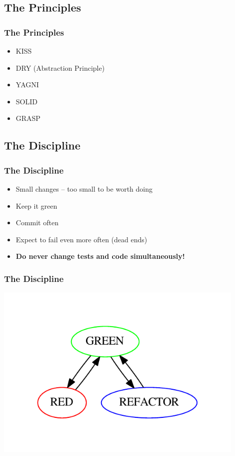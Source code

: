 \documentclass[english,handout]{beamer}
\begin{document}
\subsection{The Principles}

\begin{frame}
\frametitle{The Principles}
\begin{itemize}[<+->]
\item KISS 
\item DRY (Abstraction Principle)
\item YAGNI
\item SOLID
\item GRASP
\end{itemize}
\end{frame}

\subsection{The Discipline}

\begin{frame}
\frametitle{The Discipline}
\begin{itemize}[<+->]
\item Small changes -- too small to be worth doing
\item Keep it green
\item Commit often
\item Expect to fail even more often (dead ends)
\item \textbf{Do never change tests and code simultaneously!}
\end{itemize}
\end{frame}

\begin{frame}
\frametitle{The Discipline}
\begin{center}
\includegraphics[width=12cm]{img/red-green-refactor.pdf}
\end{center}
\end{frame}
\end{document}
